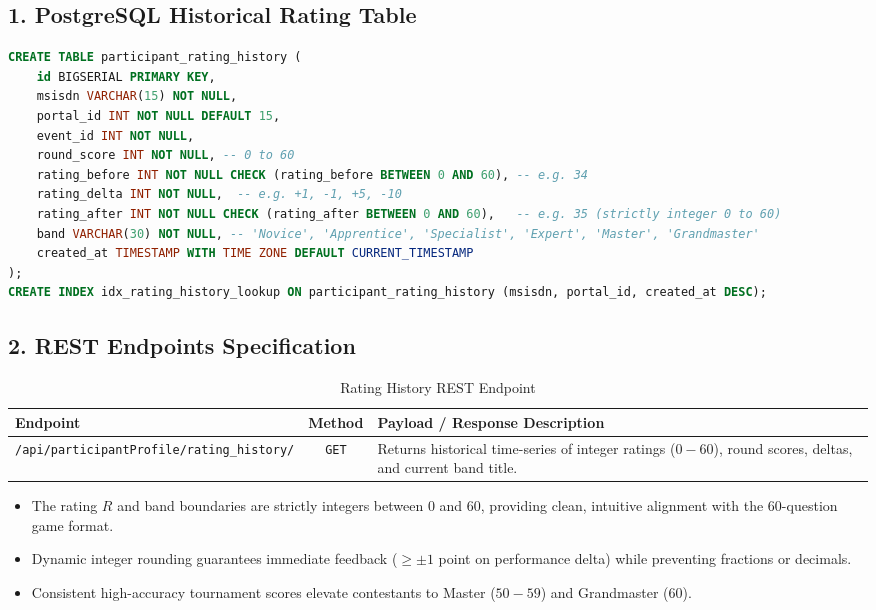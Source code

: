 \subsection{1. PostgreSQL Historical Rating Table}
\begin{lstlisting}[language=SQL, caption={PostgreSQL Schema for Integer Rating History}]
CREATE TABLE participant_rating_history (
    id BIGSERIAL PRIMARY KEY,
    msisdn VARCHAR(15) NOT NULL,
    portal_id INT NOT NULL DEFAULT 15,
    event_id INT NOT NULL,
    round_score INT NOT NULL, -- 0 to 60
    rating_before INT NOT NULL CHECK (rating_before BETWEEN 0 AND 60), -- e.g. 34
    rating_delta INT NOT NULL,  -- e.g. +1, -1, +5, -10
    rating_after INT NOT NULL CHECK (rating_after BETWEEN 0 AND 60),   -- e.g. 35 (strictly integer 0 to 60)
    band VARCHAR(30) NOT NULL, -- 'Novice', 'Apprentice', 'Specialist', 'Expert', 'Master', 'Grandmaster'
    created_at TIMESTAMP WITH TIME ZONE DEFAULT CURRENT_TIMESTAMP
);
CREATE INDEX idx_rating_history_lookup ON participant_rating_history (msisdn, portal_id, created_at DESC);
\end{lstlisting}

\subsection{2. REST Endpoints Specification}
\begin{table}[htbp]
\centering
\small
\begin{tabular}{|p{6.2cm}|c|p{7.5cm}|}
\hline
\rowcolor{primaryBlue!15}
\textbf{Endpoint} & \textbf{Method} & \textbf{Payload / Response Description} \\ \hline
\texttt{/api/participantProfile/}\newline\texttt{rating\_history/} & \texttt{GET} & Returns historical time-series of integer ratings ($0-60$), round scores, deltas, and current band title. \\ \hline
\end{tabular}
\caption{Rating History REST Endpoint}
\end{table}

\begin{tcolorbox}[summarybox, title={Chapter Key Takeaways}]
\begin{itemize}
    \item The rating $R$ and band boundaries are strictly integers between $0$ and $60$, providing clean, intuitive alignment with the 60-question game format.
    \item Dynamic integer rounding guarantees immediate feedback ($\ge \pm 1$ point on performance delta) while preventing fractions or decimals.
    \item Consistent high-accuracy tournament scores elevate contestants to Master ($50-59$) and Grandmaster ($60$).
\end{itemize}
\end{tcolorbox}
